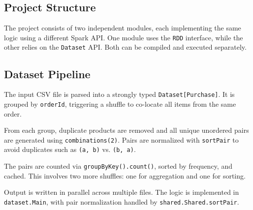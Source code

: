 \documentclass[sigconf,nonacm]{acmart}
\begin{document}
\subsection{Project Structure}
The project consists of two independent modules, each implementing the same logic using a different Spark API. One module uses the \texttt{RDD} interface, while the other relies on the \texttt{Dataset} API. Both can be compiled and executed separately.




\subsection{Dataset Pipeline}
The input CSV file is parsed into a strongly typed \texttt{Dataset[Purchase]}. It is grouped by \texttt{orderId}, triggering a shuffle to co-locate all items from the same order.

From each group, duplicate products are removed and all unique unordered pairs are generated using \texttt{combinations(2)}. Pairs are normalized with \texttt{sortPair} to avoid duplicates such as \texttt{(a, b)} vs. \texttt{(b, a)}.

The pairs are counted via \texttt{groupByKey().count()}, sorted by frequency, and cached. This involves two more shuffles: one for aggregation and one for sorting.

Output is written in parallel across multiple files. The logic is implemented in \texttt{dataset.Main}, with pair normalization handled by \texttt{shared.Shared.sortPair}.
\end{document}
